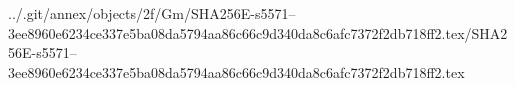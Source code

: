 ../.git/annex/objects/2f/Gm/SHA256E-s5571--3ee8960e6234ce337e5ba08da5794aa86c66c9d340da8c6afc7372f2db718ff2.tex/SHA256E-s5571--3ee8960e6234ce337e5ba08da5794aa86c66c9d340da8c6afc7372f2db718ff2.tex